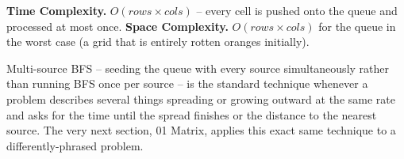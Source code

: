 \begin{complexitybox}
\textbf{Time Complexity.} $O(\textit{rows} \times \textit{cols})$ --
every cell is pushed onto the queue and processed at most once.
\textbf{Space Complexity.} $O(\textit{rows} \times \textit{cols})$ for
the queue in the worst case (a grid that is entirely rotten oranges
initially).
\end{complexitybox}

\begin{takeawaybox}
Multi-source BFS -- seeding the queue with every source simultaneously
rather than running BFS once per source -- is the standard technique
whenever a problem describes several things spreading or growing
outward at the same rate and asks for the time until the spread
finishes or the distance to the nearest source. The very next section,
01 Matrix, applies this exact same technique to a differently-phrased
problem.
\end{takeawaybox}

